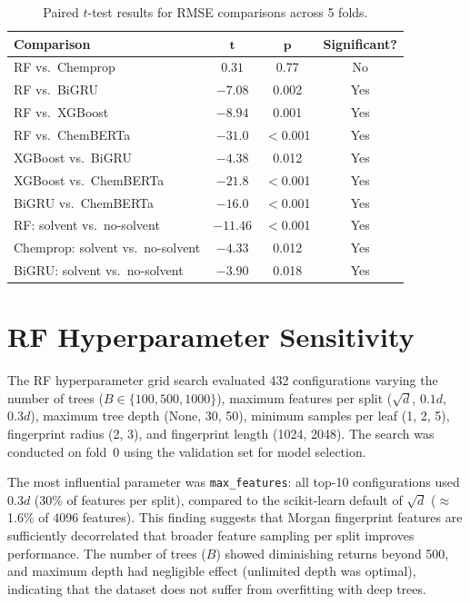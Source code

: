 \documentclass[journal=jcisd8,manuscript=suppinfo]{achemso}
\begin{document}
\begin{table}[htbp]
\centering
\caption{Paired $t$-test results for RMSE comparisons across 5 folds.}
\label{tab:significance}
\begin{tabular}{lccc}
\toprule
\textbf{Comparison} & $\boldsymbol{t}$ & $\boldsymbol{p}$ & \textbf{Significant?} \\
\midrule
RF vs.\ Chemprop            & $0.31$ & 0.77 & No \\
RF vs.\ BiGRU              & $-7.08$ & 0.002 & Yes \\
RF vs.\ XGBoost            & $-8.94$ & 0.001 & Yes \\
RF vs.\ ChemBERTa          & $-31.0$ & $<$0.001 & Yes \\
XGBoost vs.\ BiGRU         & $-4.38$ & 0.012 & Yes \\
XGBoost vs.\ ChemBERTa     & $-21.8$ & $<$0.001 & Yes \\
BiGRU vs.\ ChemBERTa       & $-16.0$ & $<$0.001 & Yes \\
RF: solvent vs.\ no-solvent  & $-11.46$ & $<$0.001 & Yes \\
Chemprop: solvent vs.\ no-solvent & $-4.33$ & 0.012 & Yes \\
BiGRU: solvent vs.\ no-solvent & $-3.90$ & 0.018 & Yes \\
\bottomrule
\end{tabular}
\end{table}


\section{RF Hyperparameter Sensitivity}
\label{sec:rf_tuning}

The RF hyperparameter grid search evaluated 432 configurations varying the number of trees ($B \in \{100, 500, 1000\}$), maximum features per split ($\sqrt{d}$, $0.1d$, $0.3d$), maximum tree depth (None, 30, 50), minimum samples per leaf (1, 2, 5), fingerprint radius (2, 3), and fingerprint length (1024, 2048).
The search was conducted on fold~0 using the validation set for model selection.

The most influential parameter was \texttt{max\_features}: all top-10 configurations used $0.3d$ (30\% of features per split), compared to the scikit-learn default of $\sqrt{d}$ ($\approx$1.6\% of 4096 features).
This finding suggests that Morgan fingerprint features are sufficiently decorrelated that broader feature sampling per split improves performance.
The number of trees ($B$) showed diminishing returns beyond 500, and maximum depth had negligible effect (unlimited depth was optimal), indicating that the dataset does not suffer from overfitting with deep trees.
\end{document}
